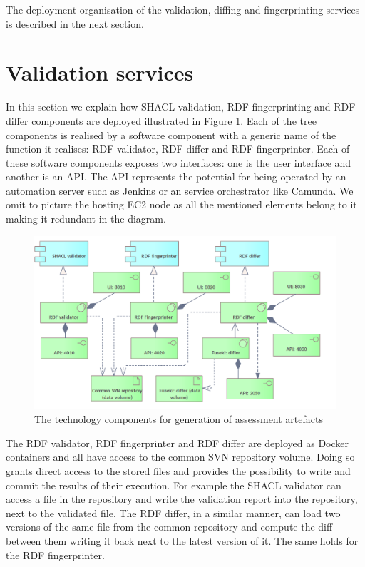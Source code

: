 	The deployment organisation of the validation, diffing and fingerprinting services is described in the next section. 
	
	
	\section{Validation services}
	\label{sec:technology-view-validation}
	
	In this section we explain how SHACL validation, RDF fingerprinting and RDF differ components are deployed illustrated in Figure \ref{fig:technology-view-validation}. Each of the tree components is realised by a software component with a generic name of the function it realises: RDF validator, RDF differ and RDF fingerprinter. Each of these software components exposes two interfaces: one is the user interface and another is an API. The API represents the potential for being operated by an automation server such as Jenkins or an service orchestrator like Camunda. We omit to picture the hosting EC2 node as all the mentioned elements belong to it making it redundant in the diagram.
	
	\begin{figure}[!h]
		\centering
		\includegraphics[width=\textwidth]{images/infra-setup/validation v2.png}
		\caption{The technology components for generation of assessment artefacts}
		\label{fig:technology-view-validation}
	\end{figure}

	The RDF validator, RDF fingerprinter and RDF differ are deployed as Docker containers and all have access to the common SVN repository volume. Doing so grants direct access to the stored files and provides the possibility to write and commit the results of their execution. For example the SHACL validator can access a file in the repository and write the validation report into the repository, next to the validated file. The RDF differ, in a similar manner, can load two versions of the same file from the common repository and compute the diff between them writing it back next to the latest version of it. The same holds for the RDF fingerprinter. 
	
